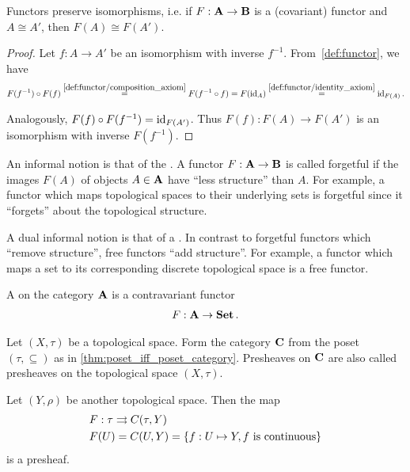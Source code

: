 \begin{proposition}\label{thm:functors_preserve_isomorphisms}\cite[exercise 1.2.21]{Leinster2014}
  Functors preserve isomorphisms, i.e. if \( F: \operatorname{\mathbf{A}} \to \operatorname{\mathbf{B}} \) is a (covariant) functor and \( A \cong A' \), then \( F(A) \cong F(A') \).
\end{proposition}
\begin{proof}
  Let \( f: A \to A' \) be an isomorphism with inverse \( f^{-1} \). From~\cref{def:functor}, we have
  \begin{align*}
    F(f^{-1}) \circ F(f)
    \overset{\ref{def:functor/composition_axiom}} =
    F(f^{-1} \circ f)
    =
    F(\operatorname{id}_A)
    \overset{\ref{def:functor/identity_axiom}} =
    \operatorname{id}_{F(A)}.
  \end{align*}

  Analogously, \( F(f) \circ F(f^{-1}) = \operatorname{id}_{F(A')} \). Thus \( F(f): F(A) \to F(A') \) is an isomorphism with inverse \( F(f^{-1}) \).
\end{proof}

\begin{note}\label{note:forgetful_free_functor}\cite[examples 1.2.3, 1.2.4]{Leinster2014}
  An informal notion is that of the . A functor \( F: \operatorname{\mathbf{A}} \to \operatorname{\mathbf{B}} \) is called forgetful if the images \( F(A) \) of objects \( A \in \operatorname{\mathbf{A}} \) have \enquote{less structure} than \( A \). For example, a functor which maps topological spaces to their underlying sets is forgetful since it \enquote{forgets} about the topological structure.

  A dual informal notion is that of a . In contrast to forgetful functors which \enquote{remove structure}, free functors \enquote{add structure}. For example, a functor which maps a set to its corresponding discrete topological space is a free functor.
\end{note}

\begin{definition}\label{def:presheaf}\cite[definition 1.2.15]{Leinster2014}
  A  on the category \( \operatorname{\mathbf{A}} \) is a contravariant functor
  \begin{align*}
    F: \operatorname{\mathbf{A}} \to \operatorname{\mathbf{Set}}.
  \end{align*}
\end{definition}

\begin{example}\label{ex:topological_space_presheaf}\cite[24]{Leinster2014}
  Let \( (X, \tau) \) be a topological space. Form the category \( \operatorname{\mathbf{C}} \) from the poset \( (\tau, \subseteq) \) as in \cref{thm:poset_iff_poset_category}. Presheaves on \( \operatorname{\mathbf{C}} \) are also called presheaves on the topological space \( (X, \tau) \).

  Let \( (Y, \rho) \) be another topological space. Then the map
  \begin{align*}
    &F: \tau \rightrightarrows C(\tau, Y) \\
    &F(U) = C(U, Y) = \{ f: U \mapsto Y, f \text{ is continuous} \}
  \end{align*}
  is a presheaf.
\end{example}

